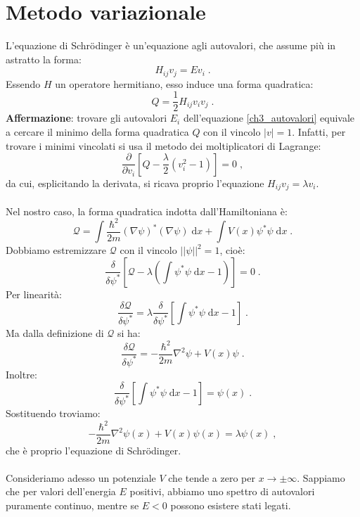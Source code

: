 \documentclass[10pt,a4paper]{report}
\theoremstyle{definition}
\numberwithin{equation}{section}
\newcommand{\diff}[1][]{\mathrm{d}#1}
\begin{document}
\section{Metodo variazionale}
L'equazione di Schrödinger è un'equazione agli autovalori, che assume più in astratto la forma:
\begin{equation}
H_{ij}v_j=Ev_i\;. \label{ch3_autovalori}
\end{equation}
Essendo $H$ un operatore hermitiano, esso induce una forma quadratica:
\begin{equation}
Q=\frac{1}{2}H_{ij}v_iv_j\;.
\end{equation}
\textbf{Affermazione}: trovare gli autovalori $E_i$ dell'equazione \eqref{ch3_autovalori} equivale a cercare il minimo della forma quadratica $Q$ con il vincolo $|v|=1$. Infatti, per trovare i minimi vincolati si usa il metodo dei moltiplicatori di Lagrange:
$$
\frac{\partial}{\partial v_i}\left[Q-\frac{\lambda}{2}(v_i^2-1)\right]=0\;,
$$
da cui, esplicitando la derivata, si ricava proprio l'equazione $H_{ij}v_j=\lambda v_i$. \\
\\
Nel nostro caso, la forma quadratica indotta dall'Hamiltoniana è:
\begin{equation}
\mathcal{Q}=\int \frac{\hbar^2}{2m}(\nabla\psi)^*(\nabla\psi)\;\diff{x}+\int V(x)\psi^*\psi\;\diff{x}\;.
\end{equation}
Dobbiamo estremizzare $\mathcal{Q}$ con il vincolo $||\psi||^2=1$, cioè:
$$
\frac{\delta}{\delta\psi^*}\left[\mathcal{Q}-\lambda\left(\int\psi^*\psi\;\diff{x}-1\right)\right]=0\;.
$$
Per linearità:
$$
\frac{\delta\mathcal{Q}}{\delta\psi^*}=\lambda\frac{\delta}{\delta\psi^*}\left[\int\psi^*\psi\;\diff{x}-1\right]\;.
$$
Ma dalla definizione di $\mathcal{Q}$ si ha:
\begin{equation}
\frac{\delta\mathcal{Q}}{\delta\psi^*}=-\frac{\hbar^2}{2m}\nabla^2\psi+V(x)\psi\;.
\end{equation}
Inoltre:
\begin{equation}
\frac{\delta}{\delta\psi^*}\left[\int\psi^*\psi\;\diff{x}-1\right]=\psi(x)\;.
\end{equation}
Sostituendo troviamo:
\begin{equation}
-\frac{\hbar^2}{2m}\nabla^2\psi(x)+V(x)\psi(x)=\lambda\psi(x)\;,
\end{equation}
che è proprio l'equazione di Schrödinger. \\
\\
Consideriamo adesso un potenziale $V$ che tende a zero per $x\to\pm\infty$. Sappiamo che per valori dell'energia $E$ positivi, abbiamo uno spettro di autovalori puramente continuo, mentre se $E<0$ possono esistere stati legati. \\
\end{document}
